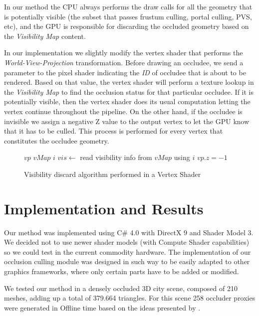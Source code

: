 \documentclass[10pt, conference]{IEEEtran}
\begin{document}
In our method the CPU always performs the draw calls for all the geometry that is potentially visible 
(the subset that passes frustum culling, portal culling, PVS, etc), and the GPU is responsible for discarding the occluded geometry based 
on the \emph{Visibility Map} content.\

In our implementation we slightly modify the vertex shader that performs the \emph{World-View-Projection} transformation. 
Before drawing an occludee, we send a parameter to the pixel shader indicating the \emph{ID} of occludee that is about to be rendered. 
Based on that value, the vertex shader will perform a texture lookup in the \emph{Visibility Map} to find the occlusion status for that particular occludee. 
If it is potentially visible, then the vertex shader does its usual computation letting the vertex continue throughout the pipeline. 
On the other hand, if the occludee is invisible we assign a negative Z value to the output vertex to let the GPU know that it has to be culled. 
This process is performed for every vertex that constitutes the occludee geometry.

\begin{figure}[!hbp]
	\begin{algorithmic}[1]
		\REQUIRE $vp$ 
		\REQUIRE $vMap$ 
		\REQUIRE $i$ 
		\STATE $vis \leftarrow$ read visibility info from $vMap$ using $i$
			\STATE {}
		\ELSE
			\STATE $vp.z = -1$ 
		\ENDIF
	\end{algorithmic}
	\caption{Visibility discard algorithm performed in a Vertex Shader}
\end{figure}





\section{Implementation and Results}
%
Our method was implemented using C\# 4.0 with DirectX 9 and Shader Model 3. 
We decided not to use newer shader models (with Compute Shader capabilities) so we could test in the current commodity hardware. 
The implementation of our occlusion culling module was designed in such way to be easily adapted to other graphics frameworks, where only certain parts have to be added or modified.\

We tested our method in a densely occluded 3D city scene, composed of 210 meshes, adding up a total of 379.664 triangles. 
For this scene 258 occluder proxies were generated in Offline time based on the ideas presented by \cite{cacic_occlusion_1}. 
\end{document}
